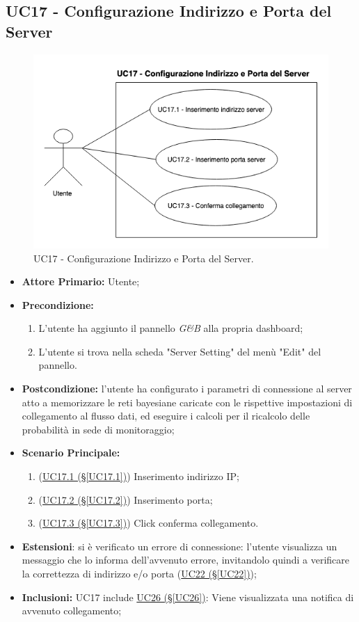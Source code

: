 \pagebreak

\subsection{UC17 - Configurazione Indirizzo e Porta del Server}\label{UC17}
\begin{figure}[H]
	\centering
	\includegraphics[scale=0.65]{./images/UC17.png}
	\caption{UC17 - Configurazione Indirizzo e Porta del Server.}
\end{figure}
\begin{itemize}
	\item \textbf{Attore Primario:}  Utente;
	\item \textbf{Precondizione:}
		\begin{enumerate}
			\item L'utente ha aggiunto il pannello \textit{G\&B} alla propria dashboard;
			\item L'utente si trova nella scheda "Server Setting" del menù "Edit" del pannello.
		\end{enumerate}
	\item \textbf{Postcondizione:} l'utente ha configurato i parametri di connessione al server atto a memorizzare le reti bayesiane caricate con le rispettive impostazioni di collegamento al flusso dati, ed eseguire i calcoli per il ricalcolo delle probabilità in sede di monitoraggio;
	\item \textbf{Scenario Principale:}
	\begin{enumerate}
		\item (\hyperref[UC17.1]{UC17.1 (§\ref*{UC17.1})}) Inserimento indirizzo IP;
		\item (\hyperref[UC17.2]{UC17.2 (§\ref*{UC17.2})}) Inserimento porta;
		\item (\hyperref[UC17.3]{UC17.3 (§\ref*{UC17.3})}) Click conferma collegamento.
	\end{enumerate}
	\item \textbf{Estensioni}: si è verificato un errore di connessione: l'utente visualizza un messaggio che lo informa dell'avvenuto errore, invitandolo quindi a verificare la correttezza di indirizzo e/o porta (\hyperref[UC22]{UC22 (§\ref*{UC22})});
	\item \textbf{Inclusioni:} UC17 include \hyperref[UC26]{UC26 (§\ref*{UC26})}: Viene visualizzata una notifica di avvenuto collegamento;
\end{itemize}

